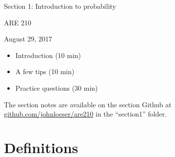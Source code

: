 \documentclass[12pt,english]{article}
\begin{document}
\begin{center}
{\Large{}Section 1: Introduction to probability}
\par\end{center}{\Large \par}

\begin{center}
ARE 210
\par\end{center}

\begin{center}
August 29, 2017
\par\end{center}

\begin{itemize}
	\item Introduction (10 min)
	\item A few tips (10 min)
	\item Practice questions (30 min)
\end{itemize}
The section notes are available on the section Github at \href{github.com/johnloeser/are210}{github.com/johnloeser/are210} in the ``section1'' folder.

\section{Definitions}
\end{document}
